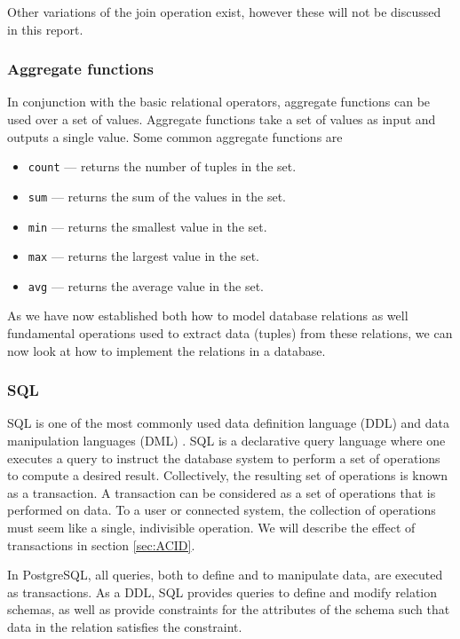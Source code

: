Other variations of the join operation exist\cite{DBSBook}, however these will not be discussed in this report.\\
\subsubsection*{Aggregate functions}
In conjunction with the basic relational operators, aggregate functions can be used over a set of values.
Aggregate functions take a set of values as input and outputs a single value\cite{DBSBook}. Some common aggregate functions are 
\begin{itemize} \label{aggregateFunctions}
    \item \texttt{count} --- returns the number of tuples in the set.
    \item \texttt{sum} --- returns the sum of the values in the set.
    \item \texttt{min} --- returns the smallest value in the set.
    \item \texttt{max} --- returns the largest value in the set.
    \item \texttt{avg} --- returns the average value in the set.
\end{itemize}


As we have now established both how to model database relations as well fundamental operations used to extract data (tuples) from these relations, we can now look at how to implement the relations in a database.

\subsubsection{SQL}\label{sec:SQL}
SQL is one of the most commonly used data definition language (DDL) and data manipulation languages (DML) \cite{DBSBook}.
SQL is a declarative query language where one executes a query to instruct the database system to perform a set of operations to compute a desired result.
Collectively, the resulting set of operations is known as a transaction.
A transaction can be considered as a set of operations that is performed on data.
To a user or connected system, the collection of operations must seem like a single, indivisible operation\cite{DBSBook}.
We will describe the effect of transactions in section \ref{sec:ACID}.


In PostgreSQL, all queries, both to define and to manipulate data, are executed as transactions\cite{postgres_transactions}.
As a DDL, SQL provides queries to define and modify relation schemas, as well as provide constraints for the attributes of the schema such that data in the relation satisfies the constraint.  

